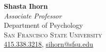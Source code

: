 \documentclass[hidelinks, 10.5pt]{article}
\def\contentwidth{0.9\linewidth}    %
\def\contentspacing{2.5mm}          %
\renewcommand{\section}[1]{
    {\fontsize{14}{14}\selectfont \textsc{\textbf{\ \ #1\ \ }}}\hrulefill
}
\begin{document}
{\begin{minipage}[ct]{\contentwidth}
\begin{multicols}{2}
        \textbf{Shasta Ihorn}\\
        \emph{Associate Professor}\\
        {Department of Psychology}\\
        \textsc{San Francisco State University}\\
        \href{tel:4153383218}{415.338.3218}, \href{mailto:sihorn@sfsu.edu}{sihorn@sfsu.edu}\\
    \end{multicols}
\end{minipage}



















}
\end{document}
